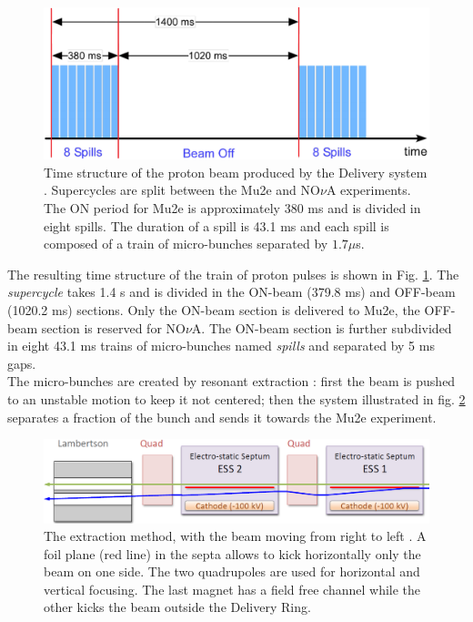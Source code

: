 \documentclass[12pt,a4paper,openright, oneside, titlepage]{book} %
\begin{document}
\begin{figure}[h!]
\centering
\includegraphics[scale=0.6]{beam_time_structure_2}
\caption[Mu2e proton beam time structure]{Time structure of the proton beam produced by the Delivery system \cite{BeamStruct}. 
Supercycles are split between the Mu2e and NO$\nu$A experiments. 
The ON period for Mu2e is approximately 380 ms and is divided in eight spills. 
The duration of a spill is 43.1 ms and each spill is composed of a train of micro-bunches 
separated by $1.7 \mu$s.}
\label{_beam_time_structure}
\end{figure}

\noindent
The resulting time structure of the train of proton pulses is shown in Fig. \ref{_beam_time_structure}.
The \textit{supercycle} takes 1.4 s and is divided in the ON-beam (379.8 ms) and OFF-beam (1020.2 ms) sections. 
Only the ON-beam section is delivered to Mu2e, the OFF-beam section is reserved for NO$\nu$A.
The ON-beam section is further subdivided in eight 43.1 ms trains of micro-bunches
named \textit{spills} and  separated by 5 ms gaps.\\
The micro-bunches are created by resonant extraction \cite{Extraction}: 
first the beam is pushed to an unstable motion to keep it not centered; 
then the system illustrated in fig. \ref{_Extraction} separates a fraction of the bunch  
and sends it towards the Mu2e experiment. 

\begin{figure}[h!]
\centering
\includegraphics[scale=0.7]{Extraction}
\caption[Resonant extraction]{The extraction method, with the beam moving from right to left \cite{Extraction}. A foil plane (red line) in the septa allows to kick horizontally only the beam on one side. The two quadrupoles are used for horizontal and vertical focusing. The last magnet has a field free channel while the other kicks the beam outside the Delivery Ring.}
\label{_Extraction}
\end{figure}
\end{document}
